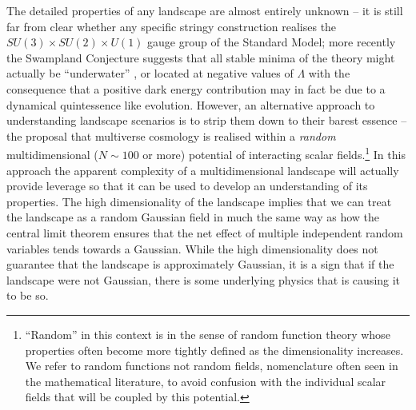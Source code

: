 \documentclass[12pt]{article}
\begin{document}
The detailed properties of any landscape are almost entirely unknown -- it is still far from clear whether any specific stringy construction  realises  the $SU(3) \times SU(2) \times U(1)$ gauge group of the Standard Model; more recently the Swampland Conjecture suggests that all stable minima of the theory might actually be ``underwater'' \cite{Agrawal2018}, or located at negative values of $\Lambda$ with the consequence that a positive dark energy contribution may in fact be due to a dynamical quintessence like evolution.   However, an alternative approach to understanding  landscape scenarios is to strip them down to their barest essence -- the proposal that multiverse cosmology is realised within a {\em random\/} multidimensional ($N\sim100$ or more) potential of interacting scalar fields.\footnote{``Random'' in this context is  in the sense of random function theory \cite{GRF1, GRF2, GRF3} whose properties often become more tightly defined as the dimensionality increases. We refer to random functions not random fields, nomenclature often seen in the mathematical literature, to avoid confusion with the individual scalar fields that will be coupled by this potential.}  In this approach the apparent complexity of a multidimensional landscape will actually provide  leverage so that it can be used to develop an understanding of its properties. The high dimensionality of the landscape implies that we can treat the landscape as a random Gaussian field in much the same way as how the central limit theorem ensures that the net effect of multiple independent random variables tends towards a Gaussian. While the high dimensionality does not guarantee that the landscape is approximately Gaussian, it is a sign that if the landscape were not Gaussian, there is some underlying physics that is causing it to be so.
 
\end{document}
